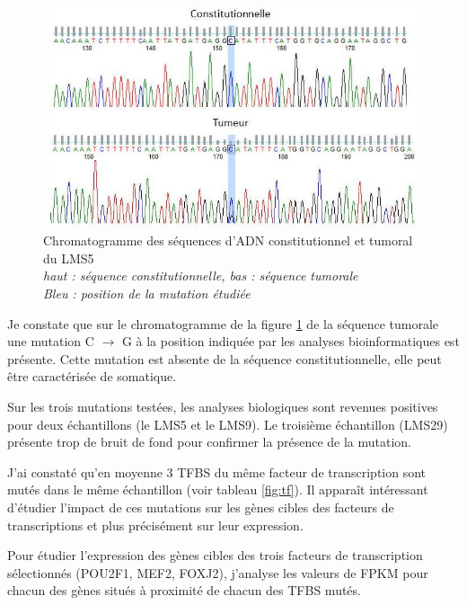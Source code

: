 \begin{figure}[h]
\centering
\includegraphics[width=15cm,height=6.5cm]{Figures/OCT1.jpg}
\captionsetup{justification=centering}
\caption{Chromatogramme des séquences d'ADN constitutionnel et tumoral du LMS5
\\ \textit{haut : séquence constitutionnelle, bas : séquence tumorale \\ Bleu : position de la mutation étudiée}}
\label{fig:oct}
\end{figure}

Je constate que sur le \gls{chromatogramme} de la figure \ref{fig:oct} de la séquence tumorale une mutation C $\rightarrow$ G à la position indiquée par les analyses bioinformatiques est présente. Cette mutation est absente de la séquence constitutionnelle, elle peut être caractérisée de somatique.

Sur les trois mutations testées, les analyses biologiques sont revenues positives pour deux échantillons (le LMS5 et le LMS9). Le troisième échantillon (LMS29) présente trop de bruit de fond pour confirmer la présence de la mutation. 

J'ai constaté qu'en moyenne 3 TFBS du même facteur de transcription sont mutés dans le même échantillon (voir tableau \ref{fig:tf}). Il apparaît intéressant d'étudier l'impact de ces mutations sur les gènes cibles des facteurs de transcriptions et plus précisément sur leur expression.

Pour étudier l'expression des gènes cibles des trois facteurs de transcription sélectionnés (POU2F1, MEF2, FOXJ2), j'analyse les valeurs de FPKM pour chacun des gènes situés à proximité de chacun des TFBS mutés.

